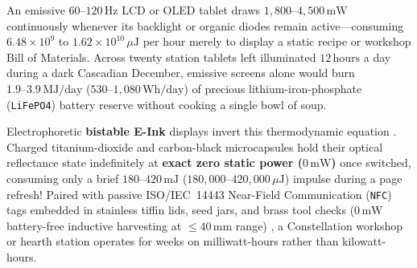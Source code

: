 An emissive $60\text{--}120\,\mathrm{Hz}$ LCD or OLED tablet draws $1{,}800\text{--}4{,}500\,\mathrm{mW}$ continuously whenever its backlight or organic diodes remain active---consuming $6.48 \times 10^{9}$ to $1.62 \times 10^{10}\,\mu\mathrm{J}$ per hour merely to display a static recipe or workshop Bill of Materials. Across twenty station tablets left illuminated $12\,\mathrm{hours}$ a day during a dark Cascadian December, emissive screens alone would burn $1.9\text{--}3.9\,\mathrm{MJ/day}$ ($530\text{--}1{,}080\,\mathrm{Wh/day}$) of precious lithium-iron-phosphate (\texttt{LiFePO4}) battery reserve without cooking a single bowl of soup.

Electrophoretic \textbf{bistable E-Ink} displays invert this thermodynamic equation \parencite{weiser1996calm}. Charged titanium-dioxide and carbon-black microcapsules hold their optical reflectance state indefinitely at \textbf{exact zero static power ($0\,\mathrm{mW}$)} once switched, consuming only a brief $180\text{--}420\,\mathrm{mJ}$ ($180{,}000\text{--}420{,}000\,\mu\mathrm{J}$) impulse during a page refresh! Paired with passive ISO/IEC~14443 Near-Field Communication (\texttt{NFC}) tags embedded in stainless tiffin lids, seed jars, and brass tool checks ($0\,\mathrm{mW}$ battery-free inductive harvesting at $\le 40\,\mathrm{mm}$ range) \parencite{ishii1997tangible}, a Constellation workshop or hearth station operates for weeks on milliwatt-hours rather than kilowatt-hours.

\begin{table}[htbp]
\centering
\caption{Thermodynamic Power, Exergy Budget, and Black-Start Survival Tier Across Layer~6 Constellation Surfaces}
\label{tab:ch6-display-exergy}
\small
{}
\end{table}


